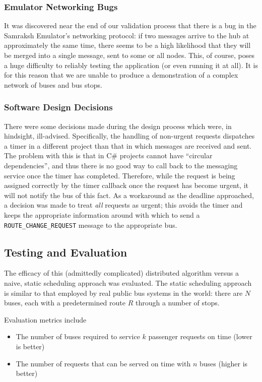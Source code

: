 \documentclass[runningheads]{llncs}
\begin{document}
\subsubsection{Emulator Networking Bugs}
It was discovered near the end of our validation process that there is a bug in the Samraksh Emulator's networking protocol: if two messages arrive to the hub at approximately the same time, there seems to be a high likelihood that they will be merged into a single message, sent to some or all nodes. This, of course, poses a huge difficulty to reliably testing the application (or even running it at all). It is for this reason that we are unable to produce a demonstration of a complex network of buses and bus stops.

\subsubsection{Software Design Decisions}
There were some decisions made during the design process which were, in hindsight, ill-advised. Specifically, the handling of non-urgent requests dispatches a timer in a different project than that in which messages are received and sent. The problem with this is that in C\# projects cannot have ``circular dependencies'', and thus there is no good way to call back to the messaging service once the timer has completed. Therefore, while the request is being assigned correctly by the timer callback once the request has become urgent, it will not notify the bus of this fact. As a workaround as the deadline approached, a decision was made to treat \emph{all} requests as urgent; this avoids the timer and keeps the appropriate information around with which to send a \lstinline{ROUTE_CHANGE_REQUEST} message to the appropriate bus.

\subsection{Testing and Evaluation}
The efficacy of this (admittedly complicated) distributed algorithm versus a naive, static scheduling approach was evaluated. The static scheduling approach is similar to that employed by real public bus systems in the world: there are $N$ buses, each with a predetermined route $R$ through a number of stops.

Evaluation metrics include
\begin{itemize}
	\item The number of buses required to service $k$ passenger requests on time (lower is better)
	\item The number of requests that can be served on time with $n$ buses (higher is better)
\end{itemize}
\end{document}
